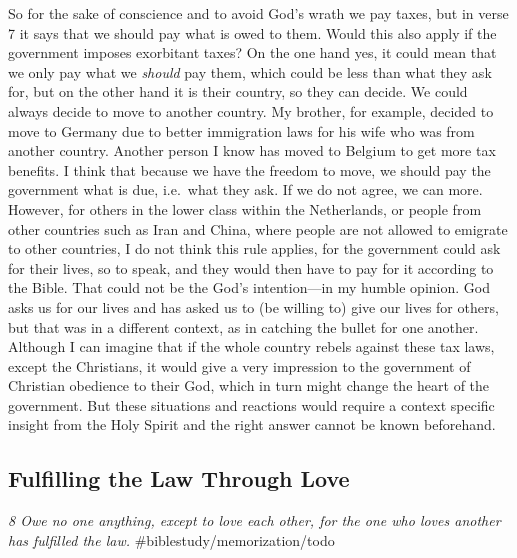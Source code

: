 So for the sake of conscience and to avoid God's wrath we pay taxes, but
in verse 7 it says that we should pay what is owed to them. Would this
also apply if the government imposes exorbitant taxes? On the one hand
yes, it could mean that we only pay what we \emph{should} pay them,
which could be less than what they ask for, but on the other hand it is
their country, so they can decide. We could always decide to move to
another country. My brother, for example, decided to move to Germany due
to better immigration laws for his wife who was from another country.
Another person I know has moved to Belgium to get more tax benefits. I
think that because we have the freedom to move, we should pay the
government what is due, i.e.~what they ask. If we do not agree, we can
more. However, for others in the lower class within the Netherlands, or
people from other countries such as Iran and China, where people are not
allowed to emigrate to other countries, I do not think this rule
applies, for the government could ask for their lives, so to speak, and
they would then have to pay for it according to the Bible. That could
not be the God's intention---in my humble opinion. God asks us for our
lives and has asked us to (be willing to) give our lives for others, but
that was in a different context, as in catching the bullet for one
another. Although I can imagine that if the whole country rebels against
these tax laws, except the Christians, it would give a very impression
to the government of Christian obedience to their God, which in turn
might change the heart of the government. But these situations and
reactions would require a context specific insight from the Holy Spirit
and the right answer cannot be known beforehand.

\subsection{Fulfilling the Law Through Love} \emph{8 Owe no one anything,
except to love each other, for the one who loves another has fulfilled
the law.} \#biblestudy/memorization/todo

